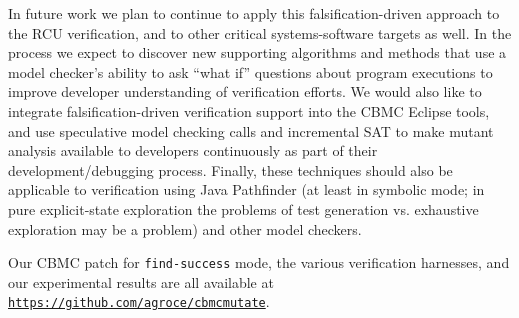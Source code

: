 \documentclass[conference]{IEEEtran}
\begin{document}
In future work we plan to continue to apply this falsification-driven
approach to the RCU verification, and to other critical
systems-software targets as well.  In the process we expect to
discover new supporting algorithms and methods that use a model
checker's ability to ask ``what if'' questions about program
executions \cite{GroceDist,MakeMost} to improve developer
understanding of verification efforts.  We would also like to
integrate falsification-driven verification support into the CBMC
Eclipse tools, and use speculative model checking calls and
incremental SAT to make mutant analysis available to developers
continuously as part of their development/debugging process.  Finally,
these techniques should also be applicable to verification using Java
Pathfinder \cite{JPF2} (at least in symbolic mode; in pure explicit-state
exploration the problems of test generation vs. exhaustive exploration
may be a problem) and other model checkers.

Our CBMC patch for {\tt find-success} mode, the various verification harnesses, and our
experimental results are all available at {\tt \url{https://github.com/agroce/cbmcmutate}}.



%







%
%
%



\end{document}
